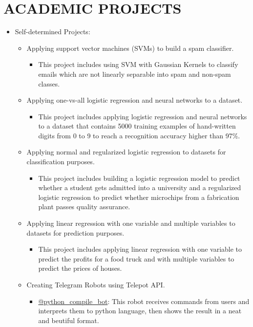 \documentclass[10pt,a4paper,sans]{moderncv} %
\begin{document}
\section{ACADEMIC PROJECTS}

\begin{itemize}
	\item Self-determined Projects:
	
	\begin{itemize}
		\item Applying support vector machines (SVMs) to build a spam classifier.
		\begin{itemize}
			\item This project includes using SVM with Gaussian Kernels to classify emails which are not linearly separable into spam and non-spam classes.
		\end{itemize}
		
		\item Applying one-vs-all logistic regression and neural networks to a dataset.
		\begin{itemize}
			\item This project includes applying logistic regression and neural networks to a dataset that contains 5000 training examples of hand-written digits from 0 to 9 to reach a recognition accuracy higher than 97\%.
		\end{itemize}
		
		\item Applying normal and regularized logistic regression to datasets for classification purposes.
		\begin{itemize}
			\item This project includes building a logistic regression model to predict whether a student gets admitted into a university and a regularized logistic regression to predict whether microchips from a fabrication plant passes quality assurance.
		\end{itemize}
		
		\item Applying linear regression with one variable and multiple variables to datasets for prediction purposes.
		\begin{itemize}
			\item This project includes applying linear regression with one variable to predict the profits for a food truck and with multiple variables to predict the prices of houses.
		\end{itemize}
			
		\item Creating Telegram Robots using Telepot API.
		 \begin{itemize}
		 	\item \href{https://telegram.me/python_compile_bot}{@python\_compile\_bot}: This robot receives commands from users and interprets them to python language, then shows the result in a neat and beutiful format.
		 \end{itemize}
		 
	\end{itemize}
\end{itemize}
\end{document}
